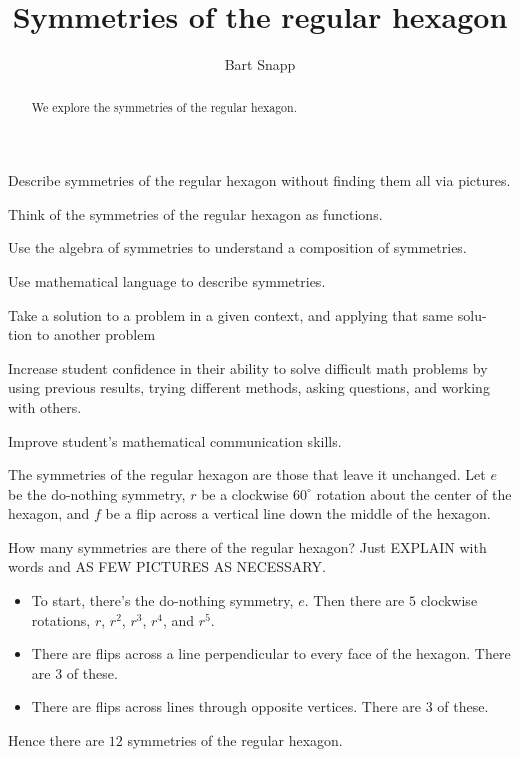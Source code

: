 \documentclass[noauthor,nooutcomes,hints,handout]{ximera}
\title{Symmetries of the regular hexagon}
\author{Bart Snapp}
\begin{document}
\begin{abstract}
  We explore the symmetries of the regular hexagon.
\end{abstract}
\maketitle

\begin{listOutcomes}
\item Describe symmetries of the regular hexagon without finding them
  all via pictures.
\item Think of the symmetries of the regular hexagon as functions.
\item Use the algebra of symmetries to understand a composition of
  symmetries.
\end{listOutcomes}

\begin{listObjectives}
 \item Use mathematical language to describe symmetries.
 \item Take a solution to a problem in a given context, and applying that same solu- tion to another problem
 \item Increase student confidence in their ability to solve difficult math problems by using previous results, trying different methods, asking questions, and working with others.
\item Improve student’s mathematical communication skills.
\end{listObjectives}
\mynewpage


\begin{question}
  The symmetries of the regular hexagon are those that leave it
  unchanged. Let $e$ be the do-nothing symmetry, $r$ be a clockwise
  $60^\circ$ rotation about the center of the hexagon, and $f$ be a
  flip across a vertical line down the middle of the hexagon.

  
  How many symmetries are there of the regular hexagon? Just
  EXPLAIN with words and AS FEW PICTURES AS NECESSARY.
  \begin{freeResponse}
    \begin{itemize}
    \item To start, there's the do-nothing symmetry, $e$. Then there are
      $5$ clockwise rotations, $r$, $r^2$, $r^3$, $r^4$, and $r^5$.
    \item There are flips across a line perpendicular to every face of
      the hexagon. There are $3$ of these.
    \item There are flips across lines through opposite
      vertices. There are $3$ of these.
    \end{itemize}
    Hence there are $12$ symmetries of the regular hexagon.
  \end{freeResponse}
\end{question}
\mynewpage
\end{document}
